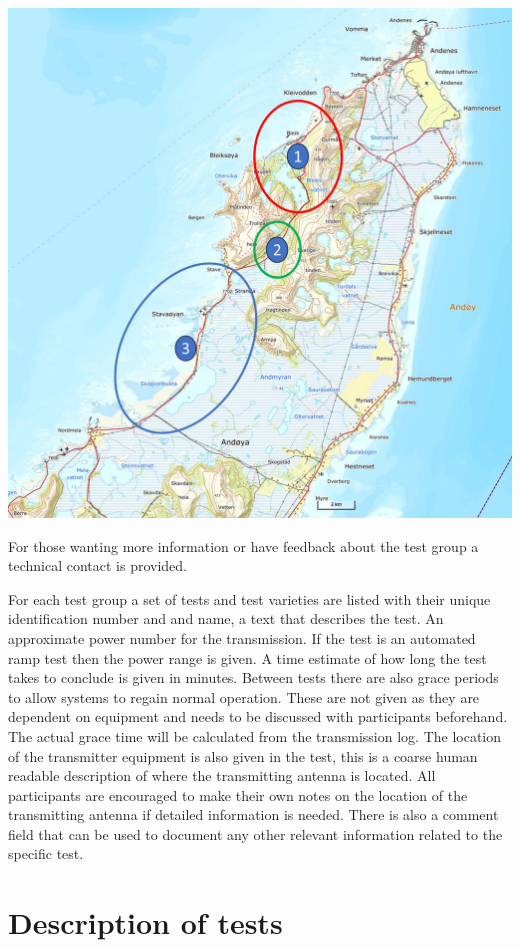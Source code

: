 \documentclass{book}
\begin{document}
\includegraphics[scale=0.4]{graphics/locations.png}

For those wanting more information or have feedback about the test group a technical contact is provided. 

For each test group a set of tests and test varieties are listed with their unique identification number and and name, a text that describes the test. An approximate power number for the transmission. If the test is an automated ramp test then the power range is given. A time estimate of how long the test takes to conclude is given in minutes. Between tests there are also grace periods to allow systems to regain normal operation. These are not given as they are dependent on equipment and needs to be discussed with participants beforehand. The actual grace time will be calculated from the transmission log. The location of the transmitter equipment is also given in the test, this is a coarse human readable description of where the transmitting antenna is located. All participants are encouraged to make their own notes on the location of the transmitting antenna if detailed information is needed. There is also a comment field that can be used to document any other relevant information related to the specific test. 

\chapter{Description of tests}

\end{document}
